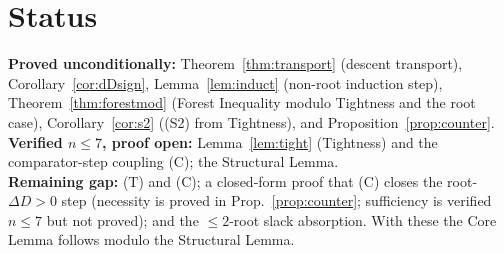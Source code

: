\documentclass[11pt]{article}
\theoremstyle{plain}
\theoremstyle{definition}
\theoremstyle{remark}
\newcommand{\dD}{\Delta D}
\begin{document}
\section{Status}
\textbf{Proved unconditionally:} Theorem~\ref{thm:transport} (descent transport),
Corollary~\ref{cor:dDsign}, Lemma~\ref{lem:induct} (non-root induction step),
Theorem~\ref{thm:forestmod} (Forest Inequality modulo Tightness and the root case),
Corollary~\ref{cor:s2} ((S2) from Tightness), and Proposition~\ref{prop:counter}.\\
\textbf{Verified $n\le7$, proof open:} Lemma~\ref{lem:tight} (Tightness) and the
comparator-step coupling (C); the Structural Lemma.\\
\textbf{Remaining gap:} (T) and (C); a closed-form proof that (C) closes the root-$\dD>0$
step (necessity is proved in Prop.~\ref{prop:counter}; sufficiency is verified $n\le7$ but
not proved); and the $\le2$-root slack absorption. With these the Core Lemma follows modulo
the Structural Lemma.
\end{document}
